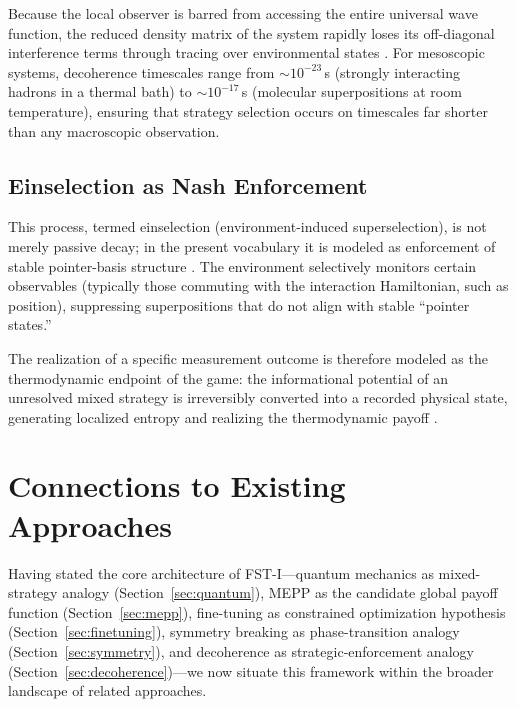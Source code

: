 \documentclass[12pt,a4paper]{article}
\theoremstyle{remark}
\begin{document}
Because the local observer is barred from accessing the entire universal wave function, the reduced density matrix of the system rapidly loses its off-diagonal interference terms through tracing over environmental states \citep{Lindblad1976}. For mesoscopic systems, decoherence timescales range from ${\sim}10^{-23}\,$s (strongly interacting hadrons in a thermal bath) to ${\sim}10^{-17}\,$s (molecular superpositions at room temperature), ensuring that strategy selection occurs on timescales far shorter than any macroscopic observation.

\subsection{Einselection as Nash Enforcement}

This process, termed einselection (environment-induced superselection), is not merely passive decay; in the present vocabulary it is modeled as enforcement of stable pointer-basis structure \citep{Zurek2003}. The environment selectively monitors certain observables (typically those commuting with the interaction Hamiltonian, such as position), suppressing superpositions that do not align with stable ``pointer states.''

The realization of a specific measurement outcome is therefore modeled as the thermodynamic endpoint of the game: the informational potential of an unresolved mixed strategy is irreversibly converted into a recorded physical state, generating localized entropy and realizing the thermodynamic payoff \citep{Lindblad1976}.

\section{Connections to Existing Approaches}
\label{sec:connections}

Having stated the core architecture of FST-I---quantum mechanics as mixed-strategy analogy (Section~\ref{sec:quantum}), MEPP as the candidate global payoff function (Section~\ref{sec:mepp}), fine-tuning as constrained optimization hypothesis (Section~\ref{sec:finetuning}), symmetry breaking as phase-transition analogy (Section~\ref{sec:symmetry}), and decoherence as strategic-enforcement analogy (Section~\ref{sec:decoherence})---we now situate this framework within the broader landscape of related approaches.
\end{document}
